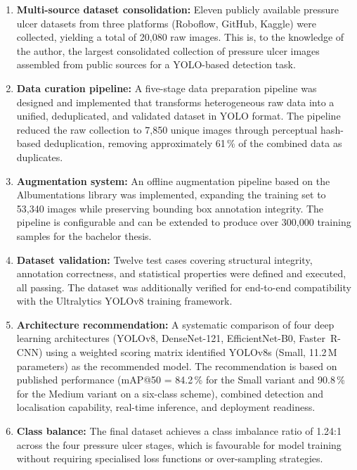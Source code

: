 \documentclass[a4paper,12pt,twoside]{report}
\begin{document}
\begin{enumerate}
  \item \textbf{Multi-source dataset consolidation:} Eleven publicly available
    pressure ulcer datasets from three platforms (Roboflow, GitHub, Kaggle) were
    collected, yielding a total of 20,080 raw images. This is, to the knowledge
    of the author, the largest consolidated collection of pressure ulcer images
    assembled from public sources for a YOLO-based detection task.

  \item \textbf{Data curation pipeline:} A five-stage data preparation pipeline
    was designed and implemented that transforms heterogeneous raw data into a
    unified, deduplicated, and validated dataset in YOLO format. The pipeline
    reduced the raw collection to 7,850 unique images through perceptual
    hash-based deduplication, removing approximately 61\,\% of the combined data
    as duplicates.

  \item \textbf{Augmentation system:} An offline augmentation pipeline based on
    the Albumentations library was implemented, expanding the training set to
    53,340 images while preserving bounding box annotation integrity. The
    pipeline is configurable and can be extended to produce over 300,000 training
    samples for the bachelor thesis.

  \item \textbf{Dataset validation:} Twelve test cases covering structural
    integrity, annotation correctness, and statistical properties were defined
    and executed, all passing. The dataset was additionally verified for
    end-to-end compatibility with the Ultralytics YOLOv8 training framework.

  \item \textbf{Architecture recommendation:} A systematic comparison of four
    deep learning architectures (YOLOv8, DenseNet-121, EfficientNet-B0,
    Faster~R-CNN) using a weighted scoring matrix identified YOLOv8s (Small,
    11.2\,M parameters) as the recommended model. The recommendation is based on
    published performance (mAP@50 = 84.2\,\% for the Small variant and
    90.8\,\% for the Medium variant on a six-class scheme), combined detection
    and localisation capability, real-time inference, and deployment readiness.

  \item \textbf{Class balance:} The final dataset achieves a class imbalance
    ratio of 1.24:1 across the four pressure ulcer stages, which is favourable
    for model training without requiring specialised loss functions or
    over-sampling strategies.
\end{enumerate}
\end{document}
